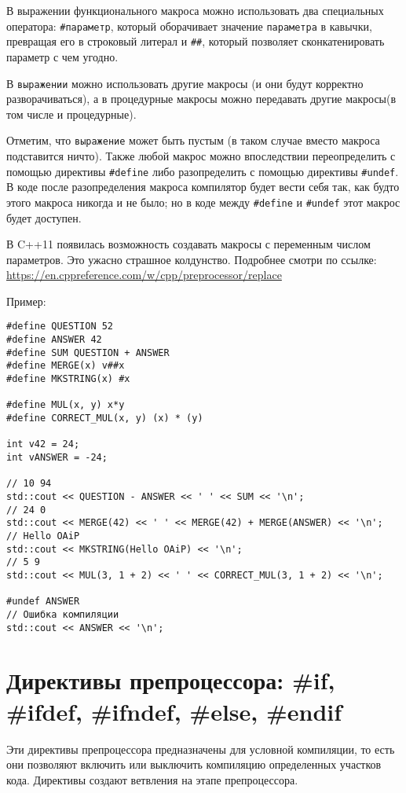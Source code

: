 В выражении функционального макроса можно использовать два специальных оператора:
\verb|#параметр|, который оборачивает значение \verb|параметра| в кавычки,
превращая его в строковый литерал и \verb|##|, который позволяет сконкатенировать
параметр с чем угодно.

В \verb|выражении| можно использовать другие макросы (и они будут корректно разворачиваться),
а в процедурные макросы можно передавать другие макросы(в том числе и процедурные).

Отметим, что \verb|выражение| может быть пустым (в таком случае
вместо макроса подставится ничто). Также любой макрос можно впоследствии переопределить
с помощью директивы \verb|#define| либо разопределить с помощью директивы \verb|#undef|.
В коде после разопределения макроса компилятор будет вести себя так, как будто этого
макроса никогда и не было; но в коде между \verb|#define| и \verb|#undef| этот макрос
будет доступен.

{\small В C++11 появилась возможность создавать макросы с переменным числом параметров.
Это ужасно страшное колдунство. Подробнее смотри по ссылке:
\url{https://en.cppreference.com/w/cpp/preprocessor/replace}}

Пример:
\begin{verbatim}
#define QUESTION 52
#define ANSWER 42
#define SUM QUESTION + ANSWER
#define MERGE(x) v##x
#define MKSTRING(x) #x

#define MUL(x, y) x*y
#define CORRECT_MUL(x, y) (x) * (y)

int v42 = 24;
int vANSWER = -24;

// 10 94
std::cout << QUESTION - ANSWER << ' ' << SUM << '\n';
// 24 0
std::cout << MERGE(42) << ' ' << MERGE(42) + MERGE(ANSWER) << '\n';
// Hello OAiP
std::cout << MKSTRING(Hello OAiP) << '\n';
// 5 9
std::cout << MUL(3, 1 + 2) << ' ' << CORRECT_MUL(3, 1 + 2) << '\n';

#undef ANSWER
// Ошибка компиляции
std::cout << ANSWER << '\n';
\end{verbatim}


\section{Директивы препроцессора: \#if, \#ifdef, \#ifndef, \#else, \#endif}
Эти директивы препроцессора предназначены для условной компиляции, то есть они позволяют
включить или выключить компиляцию определенных участков кода. Директивы создают ветвления
на этапе препроцессора.

